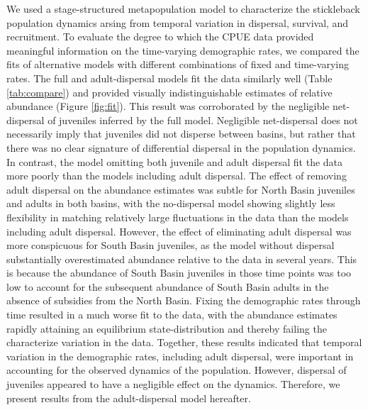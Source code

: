 \documentclass[11pt]{article}
\begin{document}
We used a stage-structured metapopulation model \citep{caswell2001matrix}
to characterize the stickleback population dynamics
arsing from temporal variation in dispersal, survival, and recruitment.
To evaluate the degree to which the CPUE data provided meaningful 
information on the time-varying demographic rates,
we compared the fits of alternative models
with different combinations of fixed and time-varying rates.
The full and adult-dispersal models fit the data similarly well (Table \ref{tab:compare})
and provided visually indistinguishable estimates of 
relative abundance (Figure \ref{fig:fit}). 
This result was corroborated by the negligible net-dispersal
of juveniles inferred by the full model.
Negligible net-dispersal does not necessarily imply 
that juveniles did not disperse between basins,
but rather that there was no clear signature of differential dispersal 
in the population dynamics.
In contrast, the model omitting both juvenile and adult dispersal fit
the data more poorly than the models including adult dispersal.
The effect of removing adult dispersal on the abundance estimates was subtle
for North Basin juveniles and adults in both basins,
with the no-dispersal model showing slightly less flexibility in matching 
relatively large fluctuations in the data than the models including adult dispersal.
However, 
the effect of eliminating adult dispersal was more conspicuous for South Basin juveniles,
as the model without dispersal substantially overestimated abundance relative to the data
in several years.
This is because the abundance of South Basin juveniles in those time points was too low 
to account for the subsequent abundance of South Basin adults 
in the absence of subsidies from the North Basin.
Fixing the demographic rates through time resulted in a much worse fit to the data,
with the abundance estimates rapidly attaining an equilibrium state-distribution
and thereby failing the characterize variation in the data.
Together, these results indicated that temporal variation in the demographic rates,
including adult dispersal, were important in accounting 
for the observed dynamics of the population.
However, dispersal of juveniles appeared to have a negligible effect on the dynamics.
Therefore, we present results from the adult-dispersal model hereafter.
\end{document}

